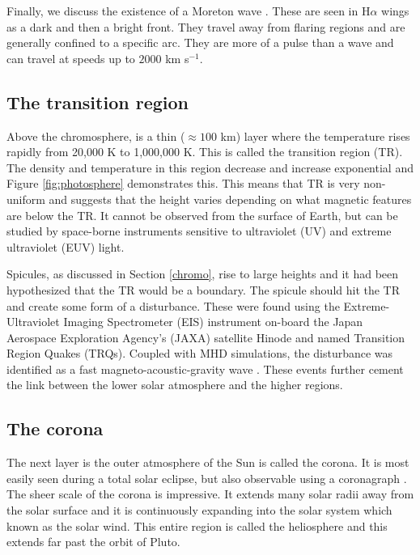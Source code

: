     Finally, we discuss the existence of a Moreton wave \citep{1960AJ.....65U.494M}.
    These are seen in H$\alpha$ wings as a dark and then a bright front.
    They travel away from flaring regions and are generally confined to a specific arc.
    They are more of a pulse than a wave and can travel at speeds up to $2000$ km s$^{-1}$.
            
\subsection{The transition region}

    Above the chromosphere, is a thin ($\approx100$ km) layer where the temperature rises rapidly from 20,000 K to 1,000,000 K.
    This is called the transition region (TR).
    The density and temperature in this region decrease and increase exponential and Figure \ref{fig:photosphere} demonstrates this.
    This means that TR is very non-uniform and \cite{tian2009solar} suggests that the height varies depending on what magnetic features are below the TR.
    It cannot be observed from the surface of Earth, but can be studied by space-borne instruments sensitive to ultraviolet (UV) and extreme ultraviolet (EUV) light.
    
    Spicules, as discussed in Section \ref{chromo}, rise to large heights and it had been hypothesized that the TR would be a boundary.
    The spicule should hit the TR and create some form of a disturbance.
    These were found using the Extreme-Ultraviolet Imaging Spectrometer (EIS) instrument on-board the Japan Aerospace Exploration Agency's (JAXA) satellite Hinode and named Transition Region Quakes (TRQs). 
    Coupled with MHD simulations, the disturbance was identified as a fast magneto-acoustic-gravity wave \citep{0004-637X-743-1-14}.
    These events further cement the link between the lower solar atmosphere and the higher regions.
    
\subsection{The corona}
\label{corona}

    The next layer is the outer atmosphere of the Sun is called the corona.
    It is most easily seen during a total solar eclipse, but also observable using a coronagraph \citep{markus2004physics}.
    The sheer scale of the corona is impressive.
    It extends many solar radii away from the solar surface and it is continuously expanding into the solar system which known as the solar wind.
    This entire region is called the heliosphere and this extends far past the orbit of Pluto.
    
